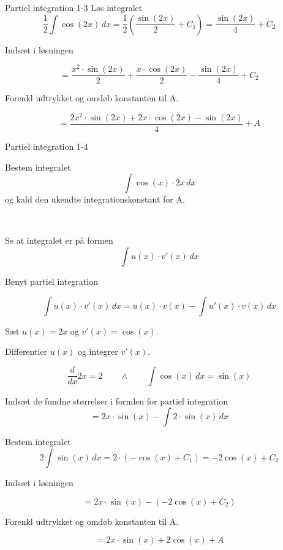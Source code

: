 \documentclass{article}
\begin{document}
\begin{exercise}{Partiel integration 1-3}
	\hint
	Løs integralet
	\[
	\frac{1}{2} \int \cos(2x) \, dx = \frac{1}{2} \left(\frac{\sin(2x)}{2} + C_1\right) = \frac{\sin(2x)}{4} + C_2
	\]
	
	\hint
	Indsæt i løsningen 
	
	\hint
	
	\[
	= \frac{x^2 \cdot \sin(2x)}{2} +  \frac{x \cdot \cos(2x)}{2} - \frac{\sin(2x)}{4} + C_2
	\]
	
	\hint
	
	Forenkl udtrykket og omdøb konstanten til A.
	
	\hint
	
	\[
	=  \frac{2x^2 \cdot \sin(2x)+2x\cdot \cos(2x) -  \sin(2x)}{4} +  A
	\]
	
	
\end{exercise}

\newpage

\begin{exercise}{Partiel integration 1-4}
	
	
	Bestem integralet
	\[
	\int \cos(x) \cdot 2x \, dx
	\]
	og kald den ukendte integrationskonstant for A.
	
	 \\
	
	
	\hint
	
	Se at integralet er på formen
	\[
	\int u(x) \cdot v'(x) \, dx
	\]
	
	\hint
	
	Benyt partiel integration
	
	\hint
	\[
	\int u(x) \cdot v'(x)\, dx = u(x) \cdot v(x) - \int u'(x) \cdot v(x) \, dx
	\]
	\hint
	
	Sæt $u(x) = 2x$ og $v'(x) = \cos(x)$.
	
	
	\hint
	
	Differentier $u(x)$ og integrer $v'(x)$.
	
	\hint
	\[
	\frac{d}{dx}2x = 2 \qquad \wedge \qquad \int \cos(x) \, dx = \sin(x)
	\]
	
	\hint
	
	Indsæt de fundne størrelser i formlen for partiel integration
	\[
	= 2x \cdot \sin(x) - \int 2 \cdot \sin(x) \, dx
	\]
	
	\hint
	
	Bestem integralet
	\[
	2 \int \sin(x) \, dx = 2 \cdot (-\cos(x) + C_1) = -2 \cos(x) + C_2
	\]
	
	\hint
	Indsæt i løsningen 
	
	\hint
	
	\[
	= 2x \cdot \sin(x) -(-2 \cos(x) + C_2)
	\]
	
	\hint
	
	Forenkl udtrykket og omdøb konstanten til A.
	
	\hint
	
	\[
	= 2x \cdot \sin(x) + 2 \cos(x) + A
	\]
	
	
\end{exercise}
\end{document}
